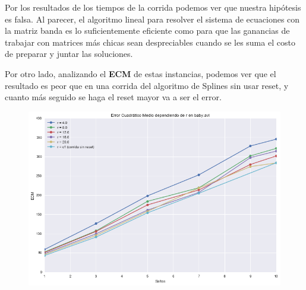 Por los resultados de los tiempos de la corrida podemos ver que nuestra
hip\'otesis es falsa. Al parecer, el algoritmo lineal para resolver el sistema
de ecuaciones con la matriz banda es lo suficientemente eficiente como para que
las ganancias de trabajar con matrices m\'as chicas sean despreciables cuando se
les suma el costo de preparar y juntar las soluciones.

Por otro lado, analizando el \textbf{ECM} de estas instancias, podemos ver que
el resultado es peor que en una corrida del algoritmo de Splines sin usar reset,
y cuanto m\'as seguido se haga el reset mayor va a ser el error.

\begin{figure}[H]
\centering
\includegraphics[width=.95\textwidth]{graficos/ecm_reset.png}
\end{figure}
